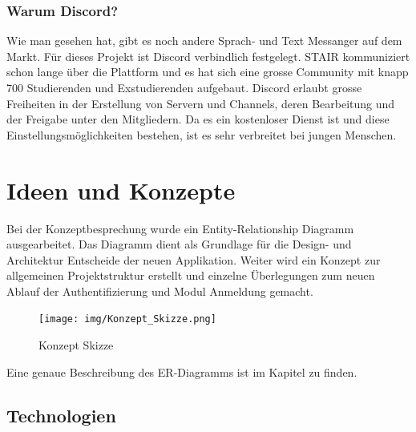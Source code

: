 \documentclass[a4paper, table]{article}
\begin{document}
\subsubsection*{Warum Discord?}
Wie man gesehen hat, gibt es noch andere Sprach- und Text Messanger auf dem Markt. 
Für dieses Projekt ist Discord verbindlich festgelegt. 
STAIR kommuniziert schon lange über die Plattform und es hat sich eine grosse Community mit knapp 700 Studierenden und Exstudierenden aufgebaut. 
Discord erlaubt grosse Freiheiten in der Erstellung von Servern und Channels, deren Bearbeitung und der Freigabe unter den Mitgliedern. 
Da es ein kostenloser Dienst ist und diese Einstellungsmöglichkeiten bestehen, ist es sehr verbreitet bei jungen Menschen.

\newpage
\section{Ideen und Konzepte}
Bei der Konzeptbesprechung wurde ein Entity-Relationship Diagramm ausgearbeitet. 
Das Diagramm dient als Grundlage für die Design- und Architektur Entscheide der neuen Applikation. 
Weiter wird ein Konzept zur allgemeinen Projektstruktur erstellt und einzelne Überlegungen zum neuen Ablauf der Authentifizierung und Modul Anmeldung gemacht.

\begin{figure}[h]
    \centering
    \texttt{[image: img/Konzept\_Skizze.png]}
    \caption{Konzept Skizze}
    \label{fig:concept-sketch}
\end{figure}

Eine genaue Beschreibung des ER-Diagramms ist im Kapitel  zu finden.

\subsection{Technologien}
\end{document}
